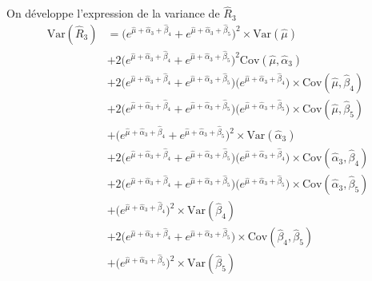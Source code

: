 On développe l'expression de la variance de $\widehat{R}_3$
\begin{align*}
\text{Var}(\widehat{R}_3) & = \Bigg(  e^{\widehat{\mu} + \widehat{\alpha}_3 + \widehat{\beta}_4} +  e^{\widehat{\mu} + \widehat{\alpha}_3 + \widehat{\beta}_5}\Bigg)^2 \times \text{Var}(\widehat{\mu}) \\
& + 2 \Bigg( e^{\widehat{\mu} + \widehat{\alpha}_3 + \widehat{\beta}_4} +  e^{\widehat{\mu} + \widehat{\alpha}_3 + \widehat{\beta}_5} \Bigg)^2 \text{Cov}(\widehat{\mu}, \widehat{\alpha}_3) \\
& + 2 \Bigg( e^{\widehat{\mu} + \widehat{\alpha}_3 + \widehat{\beta}_4} +  e^{\widehat{\mu} + \widehat{\alpha}_3 + \widehat{\beta}_5} \Bigg) \Bigg( e^{\widehat{\mu} + \widehat{\alpha}_3 + \widehat{\beta}_4} \Bigg)  \times \text{Cov}(\widehat{\mu}, \widehat{\beta}_4) \\
& + 2 \Bigg( e^{\widehat{\mu} + \widehat{\alpha}_3 + \widehat{\beta}_4} +  e^{\widehat{\mu} + \widehat{\alpha}_3 + \widehat{\beta}_5} \Bigg) \Bigg( e^{\widehat{\mu} + \widehat{\alpha}_3 + \widehat{\beta}_5} \Bigg)  \times \text{Cov}(\widehat{\mu}, \widehat{\beta}_5) \\
& + \Bigg( e^{\widehat{\mu} + \widehat{\alpha}_3 + \widehat{\beta}_4} + e^{\widehat{\mu} + \widehat{\alpha}_3 + \widehat{\beta}_5}  \Bigg)^2 \times \text{Var}(\widehat{\alpha}_3)\\
& + 2 \Bigg( e^{\widehat{\mu} + \widehat{\alpha}_3 + \widehat{\beta}_4} +  e^{\widehat{\mu} + \widehat{\alpha}_3 + \widehat{\beta}_5} \Bigg) \Bigg( e^{\widehat{\mu} + \widehat{\alpha}_3 + \widehat{\beta}_4} \Bigg)  \times \text{Cov}(\widehat{\alpha}_3, \widehat{\beta}_4) \\
& + 2 \Bigg( e^{\widehat{\mu} + \widehat{\alpha}_3 + \widehat{\beta}_4} +  e^{\widehat{\mu} + \widehat{\alpha}_3 + \widehat{\beta}_5} \Bigg) \Bigg( e^{\widehat{\mu} + \widehat{\alpha}_3 + \widehat{\beta}_5} \Bigg)  \times \text{Cov}(\widehat{\alpha}_3, \widehat{\beta}_5) \\
& + \Bigg( e^{\widehat{\mu} + \widehat{\alpha}_3 + \widehat{\beta}_4}  \Bigg)^2 \times \text{Var}(\widehat{\beta}_4)\\
& + 2 \Bigg( e^{\widehat{\mu} + \widehat{\alpha}_3 + \widehat{\beta}_4} +  e^{\widehat{\mu} + \widehat{\alpha}_3 + \widehat{\beta}_5} \Bigg) \times \text{Cov}(\widehat{\beta}_4, \widehat{\beta}_5)\\
& + \Bigg( e^{\widehat{\mu} + \widehat{\alpha}_3 + \widehat{\beta}_5}  \Bigg)^2 \times \text{Var}(\widehat{\beta}_5)
\end{align*}

